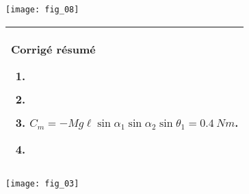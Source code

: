 \begin{multicols}{2}
\begin{corrige}
\end{corrige}
\else
\begin{center}
\texttt{[image: fig\_08]}
\end{center}

\fi



\ifprof
\else
\begin{center}
\begin{tabular}{|p{.95\linewidth}|}
\hline
\textbf{Corrigé résumé}
\begin{enumerate}
\item $\quad$
\item $\quad$
\item $C_m=-Mg\ell\sin\alpha_1\sin\alpha_2\sin\theta_1 =\SI{0,4}{Nm}$.
\item $\quad$
\end{enumerate} \\
\hline
\end{tabular}
\end{center}
\fi
\ifprof
\else
\end{multicols}
\fi

\ifprof
\else

\vspace{1cm}
\begin{center}
\texttt{[image: fig\_03]}
\end{center}
\fi
